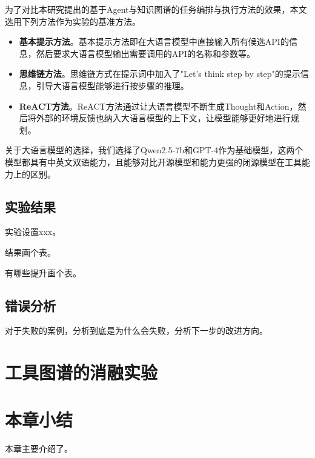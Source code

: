 为了对比本研究提出的基于Agent与知识图谱的任务编排与执行方法的效果，本文选用下列方法作为实验的基准方法。

\begin{itemize}
  \item  \textbf{基本提示方法}。基本提示方法即在大语言模型中直接输入所有候选API的信息，然后要求大语言模型输出需要调用的API的名称和参数等。
  \item  \textbf{思维链方法}\cite{Wang2023}。思维链方式在提示词中加入了"Let's think step by step"的提示信息，引导大语言模型能够进行按步骤的推理。
  \item  \textbf{ReACT方法}\cite{Yao2023}。ReACT方法通过让大语言模型不断生成Thought和Action，然后将外部的环境反馈也纳入大语言模型的上下文，让模型能够更好地进行规划。
\end{itemize}
\indent

关于大语言模型的选择，我们选择了Qwen2.5-7b和GPT-4作为基础模型，这两个模型都具有中英文双语能力，且能够对比开源模型和能力更强的闭源模型在工具能力上的区别。

\subsection{实验结果}

实验设置xxx。

结果画个表。

有哪些提升画个表。

\label{subsec:exp_results}

\subsection{错误分析}
\label{subsec:error_analysis}

对于失败的案例，分析到底是为什么会失败，分析下一步的改进方向。

\section{工具图谱的消融实验}



\section{本章小结}

本章主要介绍了。
